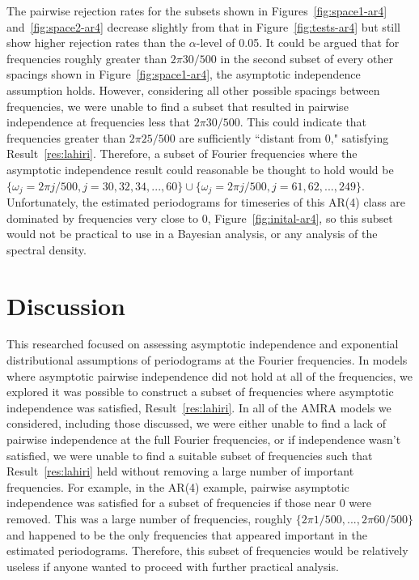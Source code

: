 \documentclass{article}\usepackage{graphicx, color}
\theoremstyle{plain}
\begin{document}
The pairwise rejection rates for the subsets shown in Figures~\ref{fig:space1-ar4} and~\ref{fig:space2-ar4} decrease slightly from that in Figure~\ref{fig:tests-ar4} but still show higher rejection rates than the $\alpha$-level of 0.05. It could be argued that for frequencies roughly greater than $2\pi 30/500$ in the second subset of every other spacings shown in Figure~\ref{fig:space1-ar4}, the asymptotic independence assumption holds. However, considering all other possible spacings between frequencies, we were unable to find a subset that resulted in pairwise independence at frequencies less that $2\pi30/500$. This could indicate that frequencies greater than $2 \pi 25/500$ are sufficiently ``distant from 0," satisfying Result~\ref{res:lahiri}. Therefore, a subset of Fourier frequencies where the asymptotic independence result could reasonable be thought to hold would be $\{\omega_j=2\pi j/500, j=30,32,34,...,60\} \cup \{\omega_j=2\pi j/500, j=61,62,...,249\}$. Unfortunately, the estimated periodograms for timeseries of this AR(4) class are dominated by frequencies very close to 0, Figure~\ref{fig:inital-ar4}, so this subset would not be practical to use in a Bayesian analysis, or any analysis of the spectral density. 


\section{Discussion}

This researched focused on assessing asymptotic independence and exponential distributional assumptions of periodograms at the Fourier frequencies. In models where asymptotic pairwise independence did not hold at all of the frequencies, we explored it was possible to construct a subset of frequencies where asymptotic independence was satisfied, Result~\ref{res:lahiri}. In all of the AMRA models we considered, including those discussed, we were either unable to find a lack of pairwise independence at the full Fourier frequencies, or if independence wasn't satisfied, we were unable to find a suitable subset of frequencies such that Result~\ref{res:lahiri} held without removing a large number of important frequencies. For example, in the AR(4) example, pairwise asymptotic independence was satisfied for a subset of frequencies if those near 0 were removed. This was a large number of frequencies, roughly $\{2\pi 1/500,...,2\pi 60/500\}$ and happened to be the only frequencies that appeared important in the estimated periodograms. Therefore, this subset of frequencies would be relatively useless if anyone wanted to proceed with further practical analysis.
\end{document}
